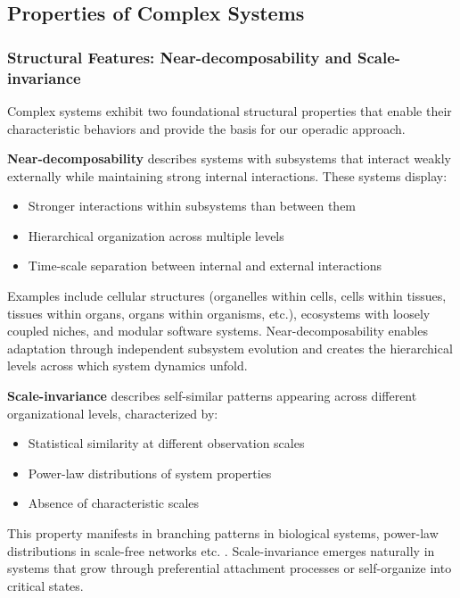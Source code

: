 \subsection{Properties of Complex Systems}

\subsubsection{Structural Features: Near-decomposability and Scale-invariance}

Complex systems exhibit two foundational structural properties that enable their characteristic behaviors and provide the basis for our operadic approach.

\textbf{Near-decomposability} \citep{simon1962architecture} describes systems with subsystems that interact weakly externally while maintaining strong internal interactions. These systems display:

\begin{itemize}
    \item Stronger interactions within subsystems than between them
    \item Hierarchical organization across multiple levels
    \item Time-scale separation between internal and external interactions
\end{itemize}

Examples include cellular structures (organelles within cells, cells within tissues, tissues within organs, organs within organisms, etc.), ecosystems with loosely coupled niches, and modular software systems. Near-decomposability enables adaptation through independent subsystem evolution \citep{simon1996sciences} and creates the hierarchical levels across which system dynamics unfold.

\textbf{Scale-invariance} describes self-similar patterns appearing across different organizational levels, characterized by:

\begin{itemize}
    \item Statistical similarity at different observation scales
    \item Power-law distributions of system properties
    \item Absence of characteristic scales
\end{itemize}

This property manifests in branching patterns in biological systems, power-law distributions in scale-free networks etc. \citep{west2017scale, stanley1999scaling}. Scale-invariance emerges naturally in systems that grow through preferential attachment processes or self-organize into critical states.

